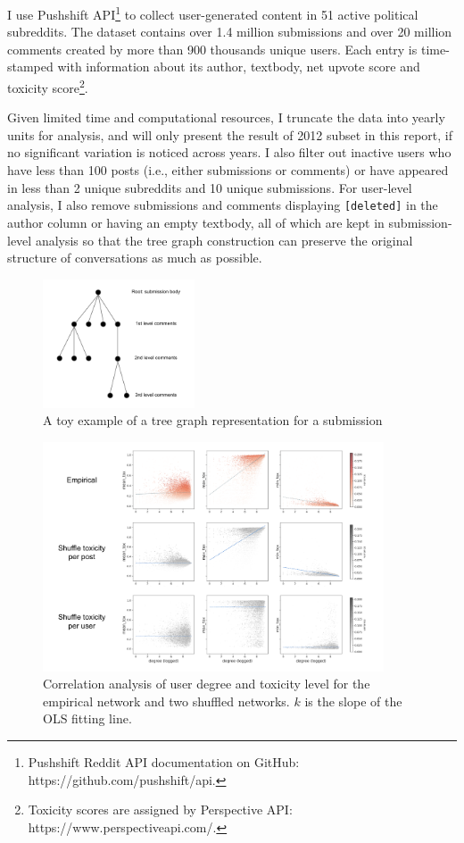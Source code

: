 \documentclass[10pt,twocolumn,letterpaper]{article}
\begin{document}
I use Pushshift API\footnote{Pushshift Reddit API documentation on GitHub: https://github.com/pushshift/api.} to collect user-generated content in 51 active political subreddits. The dataset contains over 1.4 million submissions and over 20 million comments created by more than 900 thousands unique users. Each entry is time-stamped with information about its author, textbody, net upvote score and toxicity score\footnote{Toxicity scores are assigned by Perspective API: https://www.perspectiveapi.com/.}. 

Given limited time and computational resources, I truncate the data into yearly units for analysis, and will only present the result of 2012 subset in this report, if no significant variation is noticed across years. I also filter out inactive users who have less than 100 posts (i.e., either submissions or comments) or have appeared in less than 2 unique subreddits and 10 unique submissions. For user-level analysis, I also remove submissions and comments displaying \texttt{[deleted]} in the author column or having an empty textbody, all of which are kept in submission-level analysis so that the tree graph construction can preserve the original structure of conversations as much as possible.

\begin{figure}
  \centering
  \includegraphics[width=0.4\textwidth]{figures/tree-graph.png}
  \caption{A toy example of a tree graph representation for a submission}
  \label{fig:tree-graph}
\end{figure}

\begin{figure}[ht]
	\centering
	\includegraphics[width=0.9\textwidth]{figures/degree-tox.png}
	\caption{Correlation analysis of user degree and toxicity level for the empirical network and two shuffled networks. $k$ is the slope of the OLS fitting line.}
	\label{fig:degree-tox}
\end{figure}
\end{document}
